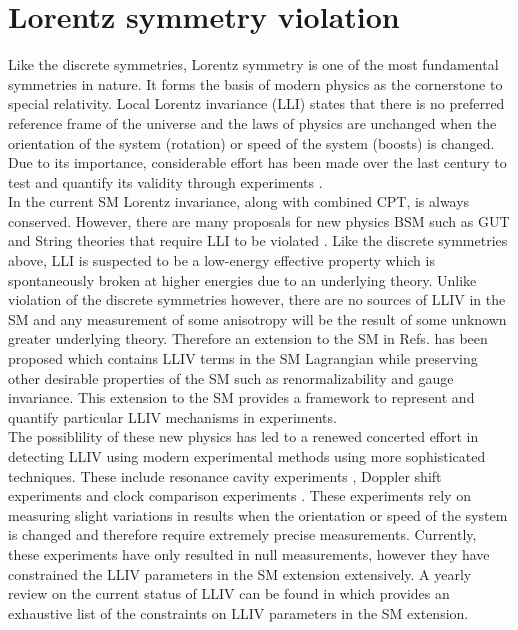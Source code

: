 \documentclass[8pt,a4paper, twoside]{report}
\begin{document}
\section{Lorentz symmetry violation} \label{sec:Lorentz}
Like the discrete symmetries, Lorentz symmetry is one of the most fundamental symmetries in nature. It forms the basis of modern physics as the cornerstone to special relativity. Local Lorentz invariance (LLI) states that there is no preferred reference frame of the universe and the laws of physics are unchanged when the orientation of the system (rotation) or speed of the system (boosts) is changed. Due to its importance, considerable effort has been made over the last century to test and quantify its validity through experiments \cite{Michelson1887, Kennedy1932, Ives1938, Robertson1949, LorentzTestSeries}.  \\
\linebreak
In the current SM Lorentz invariance, along with combined CPT, is always conserved. However, there are many proposals for new physics BSM such as GUT and String theories that require LLI to be violated \cite{Kostelecky1989,  Damour, Gambini1999, Pospelov2012, Kostelecky1995, Mavromatos2007, Liberati2013}.  Like the discrete symmetries above, LLI is suspected to be a low-energy effective property which is spontaneously broken at higher energies due to an underlying theory. Unlike violation of the discrete symmetries however,  there  are no sources of LLIV in the SM and any measurement of some anisotropy will be the result of some unknown greater underlying theory. Therefore an extension to the SM in Refs. \cite{Colladay1997, Colladay1998, Kostelecky1999, LorentzDataTables2017} has been proposed which contains LLIV terms in the SM Lagrangian while preserving other desirable properties of the SM such as renormalizability and gauge invariance. This extension to the SM provides a framework to represent and quantify particular LLIV mechanisms in experiments. \\
\linebreak
The possiblility of these new physics has led to a renewed concerted effort in detecting LLIV using modern experimental methods using more sophisticated techniques. These include  resonance cavity experiments \cite{Muller2005, Muller2003, Wolf2004}, Doppler shift experiments \cite{Lane2005, Saathoff2003} and clock comparison experiments \cite{Prestage1985, Chupp1989, Hohensee2013, Dzuba2016}. These experiments rely on measuring slight variations in results when the orientation or speed of the system is changed and therefore require extremely precise measurements. Currently, these experiments have only resulted in null measurements, however they have constrained the LLIV parameters in the SM extension extensively. A yearly review on the current status of LLIV can be found in \cite{LorentzDataTables2019} which provides an exhaustive list of the constraints on LLIV parameters in the SM extension.
\end{document}

